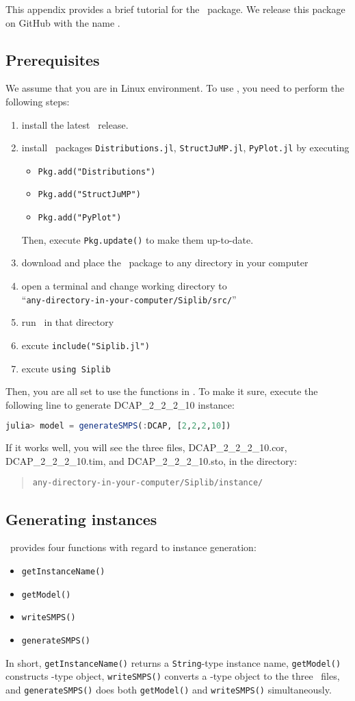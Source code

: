 This appendix provides a brief tutorial for the \julia\ package. We release this package on GitHub with the name \siplibjl.

\subsection{Prerequisites}
We assume that you are in Linux environment. To use \siplibjl, you need to perform the following steps:
\begin{enumerate}
	\item install the latest \julia\ release.
	\item install \julia\ packages \texttt{Distributions.jl}, \texttt{StructJuMP.jl}, \texttt{PyPlot.jl} by executing
	\begin{itemize}
		\item \texttt{Pkg.add("Distributions")}
		\item \texttt{Pkg.add("StructJuMP")}
		\item \texttt{Pkg.add("PyPlot")}
	\end{itemize}
	Then, execute \texttt{Pkg.update()} to make them up-to-date.
	\item download and place the \siplibjl\ package to any directory in your computer
	\item open a terminal and change working directory to\\ ``\texttt{any-directory-in-your-computer/Siplib/src/}''
	\item run \julia\ in that directory
	\item excute \texttt{include("Siplib.jl")}
	\item excute \texttt{using Siplib}
\end{enumerate}
Then, you are all set to use the functions in \siplibjl. To make it sure, execute the following line to generate DCAP\_2\_2\_2\_10 instance:
\begin{lstlisting}[frame=single,language=julia]
julia> model = generateSMPS(:DCAP, [2,2,2,10])
\end{lstlisting}
If it works well, you will see the three files, DCAP\_2\_2\_2\_10.cor, DCAP\_2\_2\_2\_10.tim, and DCAP\_2\_2\_2\_10.sto, in the directory:
\begin{quote}
\centering\texttt{any-directory-in-your-computer/Siplib/instance/}
\end{quote}
\subsection{Generating instances}
\siplibjl\ provides four functions with regard to instance generation:
\begin{itemize}
	\item \texttt{getInstanceName()}
	\item \texttt{getModel()}
	\item \texttt{writeSMPS()}
	\item \texttt{generateSMPS()}
\end{itemize}
In short, \texttt{getInstanceName()} returns a \texttt{String}-type instance name, \texttt{getModel()} constructs \jumpmodel-type object, \texttt{writeSMPS()} converts a \jumpmodel-type object to the three \smps\ files, and \texttt{generateSMPS()} does both \texttt{getModel()} and \texttt{writeSMPS()} simultaneously.
